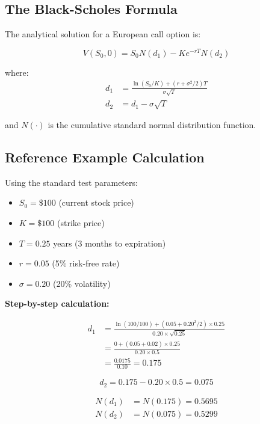 \documentclass[12pt,a4paper]{article}
\numberwithin{algorithm}{subsection}
\begin{document}
\subsection{The Black-Scholes Formula}

The analytical solution for a European call option is:

\begin{equation}
V(S_0, 0) = S_0 N(d_1) - Ke^{-rT} N(d_2)
\end{equation}

where:
\begin{align}
d_1 &= \frac{\ln(S_0/K) + (r + \sigma^2/2)T}{\sigma\sqrt{T}} \\
d_2 &= d_1 - \sigma\sqrt{T}
\end{align}

and $N(\cdot)$ is the cumulative standard normal distribution function.

\subsection{Reference Example Calculation}

Using the standard test parameters:
\begin{itemize}
\item $S_0 = \$100$ (current stock price)
\item $K = \$100$ (strike price)
\item $T = 0.25$ years (3 months to expiration)
\item $r = 0.05$ (5\% risk-free rate)
\item $\sigma = 0.20$ (20\% volatility)
\end{itemize}

\textbf{Step-by-step calculation:}

\begin{align}
d_1 &= \frac{\ln(100/100) + (0.05 + 0.20^2/2) \times 0.25}{0.20 \times \sqrt{0.25}} \\
    &= \frac{0 + (0.05 + 0.02) \times 0.25}{0.20 \times 0.5} \\
    &= \frac{0.0175}{0.10} = 0.175
\end{align}

\begin{equation}
d_2 = 0.175 - 0.20 \times 0.5 = 0.075
\end{equation}

\begin{align}
N(d_1) &= N(0.175) = 0.5695 \\
N(d_2) &= N(0.075) = 0.5299
\end{align}
\end{document}
